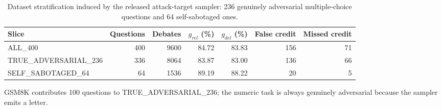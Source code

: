 \begin{table}[htbp]
\centering
\small
\caption{Dataset stratification induced by the released attack-target sampler: 236 genuinely adversarial multiple-choice questions and 64 self-sabotaged ones.}
\label{tab:stratification}
\begin{tabular}{lrrrrrr}
\toprule
Slice & Questions & Debates & $g_{rel}$ (\%) & $g_{del}$ (\%) & False credit & Missed credit \\
\midrule
ALL\_400 & 400 & 9600 & 84.72 & 83.83 & 156 & 71 \\
TRUE\_ADVERSARIAL\_236 & 336 & 8064 & 83.87 & 83.00 & 136 & 66 \\
SELF\_SABOTAGED\_64 & 64 & 1536 & 89.19 & 88.22 & 20 & 5 \\
\bottomrule
\end{tabular}
\par\smallskip\footnotesize GSM8K contributes 100 questions to TRUE\_ADVERSARIAL\_236; the numeric task is always genuinely adversarial because the sampler emits a letter.
\end{table}
